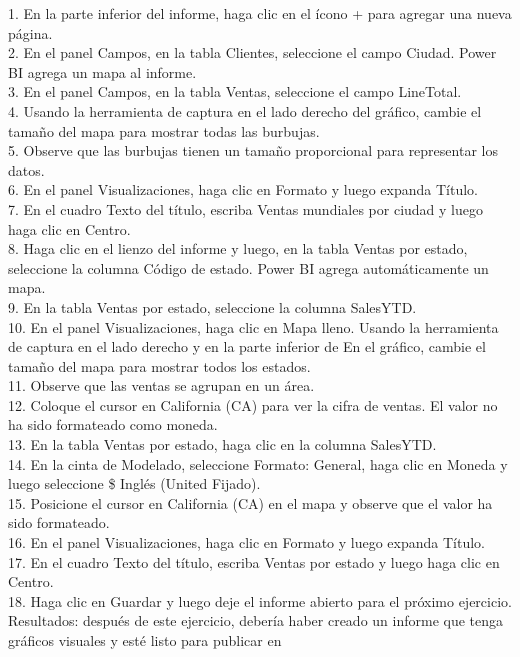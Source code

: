 \documentclass[12pt,letterpaper]{article}
\begin{document}
\begin{flushleft}
\begin{itemize}
1. En la parte inferior del informe, haga clic en el ícono + para agregar una nueva página.\\
2. En el panel Campos, en la tabla Clientes, seleccione el campo Ciudad. Power BI agrega un mapa al informe.\\
3. En el panel Campos, en la tabla Ventas, seleccione el campo LineTotal.\\
4. Usando la herramienta de captura en el lado derecho del gráfico, cambie el tamaño del mapa para mostrar todas las burbujas.\\
5. Observe que las burbujas tienen un tamaño proporcional para representar los datos.\\
6. En el panel Visualizaciones, haga clic en Formato y luego expanda Título.\\
7. En el cuadro Texto del título, escriba Ventas mundiales por ciudad y luego haga clic en Centro.\\
8. Haga clic en el lienzo del informe y luego, en la tabla Ventas por estado, seleccione la columna Código de estado. Power BI
agrega automáticamente un mapa.\\
9. En la tabla Ventas por estado, seleccione la columna SalesYTD.\\
10. En el panel Visualizaciones, haga clic en Mapa lleno. Usando la herramienta de captura en el lado derecho y en la parte inferior de
En el gráfico, cambie el tamaño del mapa para mostrar todos los estados.\\
11. Observe que las ventas se agrupan en un área.\\
12. Coloque el cursor en California (CA) para ver la cifra de ventas. El valor no ha sido formateado como moneda.\\
13. En la tabla Ventas por estado, haga clic en la columna SalesYTD.\\
14. En la cinta de Modelado, seleccione Formato: General, haga clic en Moneda y luego seleccione \$ Inglés (United
Fijado).\\
15. Posicione el cursor en California (CA) en el mapa y observe que el valor ha sido formateado.\\
16. En el panel Visualizaciones, haga clic en Formato y luego expanda Título.\\
17. En el cuadro Texto del título, escriba Ventas por estado y luego haga clic en Centro.\\
18. Haga clic en Guardar y luego deje el informe abierto para el próximo ejercicio.\\
Resultados: después de este ejercicio, debería haber creado un informe que tenga gráficos visuales y esté listo para publicar en

\end{itemize}
\end{flushleft}
\end{document}
